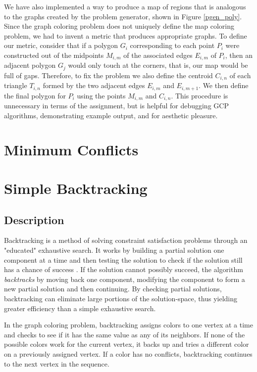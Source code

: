 \documentclass{article}
\begin{document}
	We have also implemented a way to produce a map of regions that is analogous to the graphs created by the problem generator, shown in Figure \ref{pgen_poly}.  
	Since the graph coloring problem does not uniquely define the map coloring problem, we had to invent a metric that produces appropriate graphs. To define our metric, consider that if a polygon $G_i$ corresponding to each point $P_i$ were constructed out of the midpoints $M_{i,m}$ of the associated edges $E_{i,m}$ of $P_i$, then an adjacent polygon $G_j$ would only touch at the corners, that is, our map would be full of gaps. Therefore, to fix the problem we also define the centroid $C_{i,n}$ of each triangle $T_{i,n}$ formed by the two adjacent edges $E_{i,m}$ and $E_{i,m+1}$. We then define the final polygon for $P_i$ using the points $M_{i,m}$ and $C_{i,n}$. This procedure is unnecessary in terms of the assignment, but is helpful for debugging GCP algorithms, demonstrating example output, and for aesthetic pleasure.
		
\section{Minimum Conflicts}
	
\section{Simple Backtracking}
	\subsection{Description}
		\label{simpe_desc}
		Backtracking is a method of solving constraint satisfaction problems through an "educated" exhaustive search. It works by building a partial solution one component at a time and then testing the solution to check if the solution still has a chance of success \cite{Golomb}. If the solution cannot possibly succeed, the algorithm \textit{backtracks} by moving back one component, modifying the component to form a new partial solution and then continuing. By checking partial solutions, backtracking can eliminate large portions of the solution-space, thus yielding greater efficiency than a simple exhaustive search.
		
		In the graph coloring problem, backtracking assigns colors to one vertex at a time and checks to see if it has the same value as any of its neighbors. If none of the possible colors work for the current vertex, it backs up and tries a different color on a previously assigned vertex. If a color has no conflicts, backtracking continues to the next vertex in the sequence.
		
\end{document}
